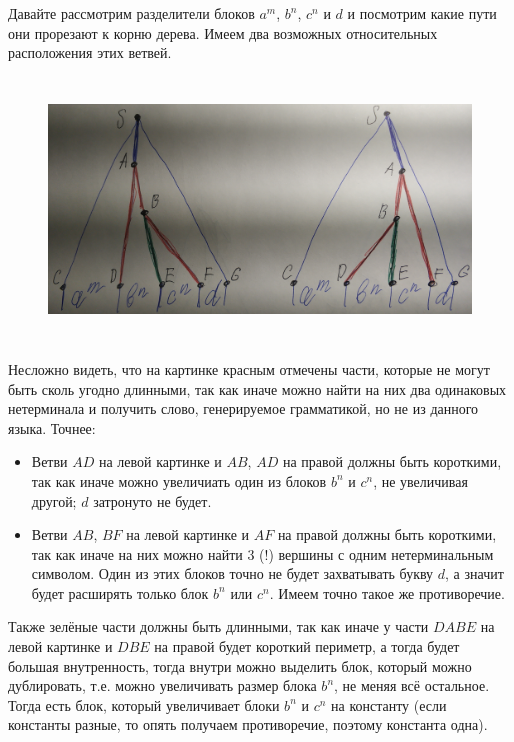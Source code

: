 \documentclass[12pt,a4paper]{article}
\begin{document}
    \begin{problem}{5}
        Давайте рассмотрим разделители блоков $a^m$, $b^n$, $c^n$ и $d$ и посмотрим какие пути они прорезают к корню дерева. Имеем два возможных относительных расположения этих ветвей.
        \begin{figure}[H]
            \centering
            \includegraphics[height=7cm]{TI-HW-006-1.jpg}
        \end{figure}

        Несложно видеть, что на картинке красным отмечены части, которые не могут быть сколь угодно длинными, так как иначе можно найти на них два одинаковых нетерминала и получить слово, генерируемое грамматикой, но не из данного языка. Точнее:
        \begin{itemize}
            \item Ветви $AD$ на левой картинке и $AB$, $AD$ на правой должны быть короткими, так как иначе можно увеличиать один из блоков $b^n$ и $c^n$, не увеличивая другой; $d$ затронуто не будет.
            \item Ветви $AB$, $BF$ на левой картинке и $AF$ на правой должны быть короткими, так как иначе на них можно найти 3 (!) вершины с одним нетерминальным символом. Один из этих блоков точно не будет захватывать букву $d$, а значит будет расширять только блок $b^n$ или $c^n$. Имеем точно такое же противоречие.
        \end{itemize}
        Также зелёные части должны быть длинными, так как иначе у части $DABE$ на левой картинке и $DBE$ на правой будет короткий периметр, а тогда будет большая внутренность, тогда внутри можно выделить блок, который можно дублировать, т.е. можно увеличивать размер блока $b^n$, не меняя всё остальное. Тогда есть блок, который увеличивает блоки $b^n$ и $c^n$ на константу (если константы разные, то опять получаем противоречие, поэтому константа одна).


\end{problem}
\end{document}
